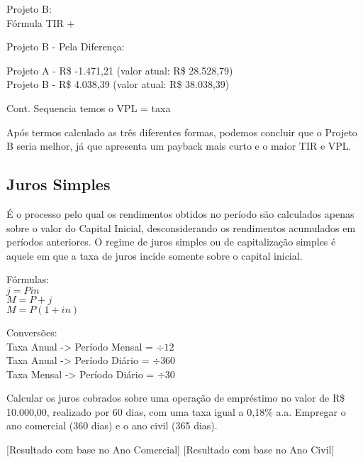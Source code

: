 Projeto B: \\
Fórmula TIR +      

Projeto B - Pela Diferença: \\
                  \keystroke{$-$}

Projeto A - R\$ -1.471,21 (valor atual: R\$ 28.528,79) \\
Projeto B - R\$ 4.038,39 (valor atual: R\$ 38.038,39)

Cont. Sequencia temos o VPL = taxa   

Após termos calculado as três diferentes formas, podemos concluir que o Projeto B seria melhor, já que apresenta um payback mais curto e o maior TIR e VPL.

\subsection*{Juros Simples}
É o processo pelo qual os rendimentos obtidos no período são calculados apenas sobre o valor do Capital Inicial, desconsiderando os rendimentos acumulados em períodos anteriores. O regime de juros simples ou de
capitalização simples é aquele em que a taxa de juros incide somente sobre o capital inicial.

Fórmulas: \\
$j = P i n$ \\
$M = P + j$ \\
$M = P (1 + i n)$

Conversões: \\
Taxa Anual -> Período Mensal = $\div 12$ \\
Taxa Anual -> Período Diário = $\div 360$ \\
Taxa Mensal -> Período Diário = $\div 30$

Calcular os juros cobrados sobre uma operação de empréstimo no valor de R\$ 10.000,00, realizado por 60 dias, com uma taxa igual a 0,18\% a.a. Empregar o ano comercial (360 dias) e o ano civil (365 dias).

                
[Resultado com base no Ano Comercial]
[Resultado com base no Ano Civil]

